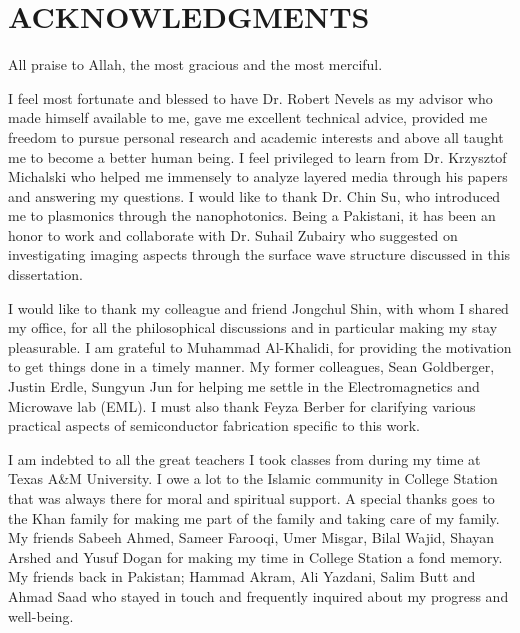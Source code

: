 %
%
%


\chapter*{ACKNOWLEDGMENTS}


\indent

All praise to Allah, the most gracious and the most merciful.

I feel most fortunate and blessed to have Dr. Robert Nevels as my advisor who  made himself available to me, gave me excellent technical advice, provided me freedom to pursue personal research and academic interests and above all taught me to become a better human being. I feel privileged to learn from Dr. Krzysztof Michalski who helped me immensely to analyze layered media through his papers and answering my questions. I would like to thank Dr. Chin Su, who introduced me to plasmonics through the nanophotonics. Being a Pakistani, it has been an honor to work and collaborate with Dr. Suhail Zubairy who suggested on investigating imaging aspects through the surface wave structure discussed in this dissertation.

I would like to thank my colleague and friend Jongchul Shin, with whom I shared my office, for all the philosophical discussions and in particular making my stay pleasurable. I am grateful to Muhammad Al-Khalidi, for providing the motivation to get things done in a timely manner. My former colleagues, Sean Goldberger, Justin Erdle, Sungyun Jun for helping me settle in the Electromagnetics and Microwave lab (EML). I must also thank Feyza Berber for clarifying various practical aspects of semiconductor fabrication specific to this work.

I am indebted to all the great teachers I took classes from during my time at Texas A\&M University. I owe a lot to the Islamic community in College Station that was always there for moral and spiritual support. A special thanks goes to the Khan family for making me part of the family and taking care of my family. My friends Sabeeh Ahmed, Sameer Farooqi, Umer Misgar, Bilal Wajid, Shayan Arshed and Yusuf Dogan for making my time in College Station a fond memory. My friends back in Pakistan; Hammad Akram, Ali Yazdani, Salim Butt and Ahmad Saad who stayed in touch and frequently inquired about my progress and well-being.

